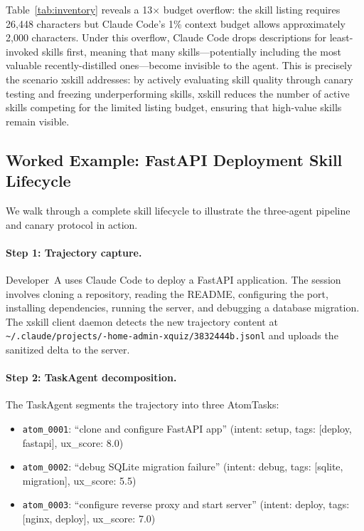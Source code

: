\documentclass{article}
\begin{document}
Table~\ref{tab:inventory} reveals a 13$\times$ budget overflow: the skill listing requires 26,448 characters but Claude Code's 1\% context budget allows approximately 2,000 characters. Under this overflow, Claude Code drops descriptions for least-invoked skills first, meaning that many skills---potentially including the most valuable recently-distilled ones---become invisible to the agent. This is precisely the scenario xskill addresses: by actively evaluating skill quality through canary testing and freezing underperforming skills, xskill reduces the number of active skills competing for the limited listing budget, ensuring that high-value skills remain visible.

\subsection{Worked Example: FastAPI Deployment Skill Lifecycle}

We walk through a complete skill lifecycle to illustrate the three-agent pipeline and canary protocol in action.

\paragraph{Step 1: Trajectory capture.} Developer~A uses Claude Code to deploy a FastAPI application. The session involves cloning a repository, reading the README, configuring the port, installing dependencies, running the server, and debugging a database migration. The xskill client daemon detects the new trajectory content at \texttt{\~{}/.claude/projects/-home-admin-xquiz/\allowbreak 3832444b.jsonl} and uploads the sanitized delta to the server.

\paragraph{Step 2: TaskAgent decomposition.} The TaskAgent segments the trajectory into three AtomTasks:
\begin{itemize}
    \item \texttt{atom\_0001}: ``clone and configure FastAPI app'' (intent: setup, tags: [deploy, fastapi], ux\_score: 8.0)
    \item \texttt{atom\_0002}: ``debug SQLite migration failure'' (intent: debug, tags: [sqlite, migration], ux\_score: 5.5)
    \item \texttt{atom\_0003}: ``configure reverse proxy and start server'' (intent: deploy, tags: [nginx, deploy], ux\_score: 7.0)
\end{itemize}
\end{document}
